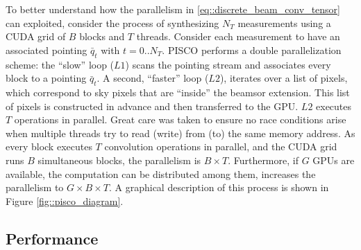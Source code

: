 \documentclass[a4paper,11pt]{article}
\begin{document}
To better understand how the parallelism in \ref{eq::discrete_beam_conv_tensor} can exploited, consider the process of synthesizing $N_T$ measurements using a CUDA grid of $B$ blocks and $T$ threads. Consider each measurement to have an associated pointing $\bar{q}_t$ with $t=0..N_T$. PISCO performs a double parallelization scheme: the ``slow'' loop ($L1$) scans the pointing stream and associates every block to a pointing $\bar{q}_t$. A second, ``faster'' loop ($L2$), iterates over a list of pixels, which correspond to sky pixels that are ``inside'' the beamsor extension. This list of pixels is constructed in advance and then transferred to the GPU. $L2$ executes $T$ operations in parallel. Great care was taken to ensure no race conditions arise when multiple threads try to read (write) from (to) the same memory address. As every block executes $T$ convolution operations in parallel, and the CUDA grid runs $B$ simultaneous blocks, the parallelism is $B \times T$. Furthermore, if $G$ GPUs are available, the computation can be distributed among them, increases the parallelism to $G \times B \times T$. A graphical description of this process is shown in Figure \ref{fig::pisco_diagram}.

\subsection{Performance}
\end{document}

